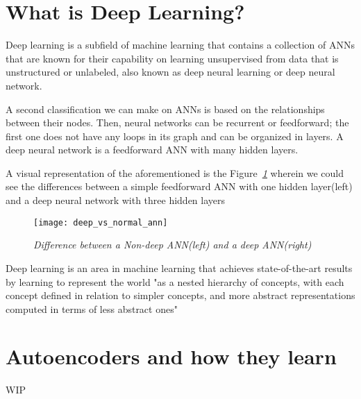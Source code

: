\section{What is Deep Learning?}

Deep learning is a subfield of machine learning that contains a collection of ANNs that are known for
their capability on learning unsupervised from data that is unstructured or unlabeled,
also known as deep neural learning or deep neural network.

A second classification we can make on ANNs is based on the relationships between their nodes.
Then, neural networks can be recurrent or feedforward;
the first one does not have any loops in its graph and can be organized in layers.
A deep neural network is a feedforward ANN with many hidden layers.

A visual representation of the aforementioned is the Figure\emph{~\ref{fig:deep_vs_normal}}
wherein we could see the differences between a simple feedforward ANN with one
hidden layer(left) and a deep neural network with three hidden layers
\begin{figure}[h]
    \centering
    \texttt{[image: deep\_vs\_normal\_ann]}
    \caption{\emph{Difference between a Non-deep ANN(left) and a deep ANN(right) \cite{deepLearningBook}}}
    \label{fig:deep_vs_normal}
\end{figure}

Deep learning is an area in machine learning that achieves state-of-the-art
results by learning to represent the world "as a nested hierarchy of concepts,
with each concept defined in relation to simpler concepts,
and more abstract representations computed in terms of less abstract ones" \cite{Goodfellow-et-al-2016}


\section{Autoencoders and how they learn}
WIP
